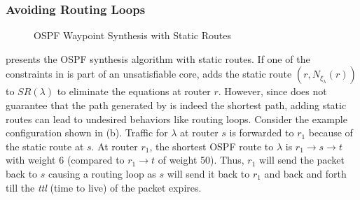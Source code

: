 

\subsubsection{Avoiding Routing Loops} \label{sec:loopavoidance}
\begin{wrapfigure}{r}{0.5\textwidth}
	\vspace{-7mm}
	\begin{minipage}{\linewidth}
		\begin{algorithm}[H]
			\begin{footnotesize} 
				\caption{OSPF Waypoint Synthesis with Static Routes}
				\label{alg:wayptunsat}
				\begin{algorithmic}[1]
					\EndWhile
					\EndProcedure
				\end{algorithmic}
			\end{footnotesize}
		\end{algorithm}
	\end{minipage}
\end{wrapfigure}
 presents the OSPF 
synthesis algorithm with static routes.  
If one of the constraints in  is part of an unsatisfiable  
core, \name adds the static route $(r, N_{\xi_\lambda}(r))$ to
$SR(\lambda)$ to eliminate the equations at router $r$. 
However, since  does not guarantee that the path generated
by \genesis is indeed the shortest path, adding
static routes can lead to undesired behaviors like routing loops.  
Consider the example configuration shown in (b). 
Traffic for $\lambda$ at router $s$ is forwarded to $r_1$ because of the
static route at $s$. At router $r_1$, the shortest OSPF route to
$\lambda$ is $r_1 \rightarrow s \rightarrow t$ with weight 6 (compared 
to $r_1 \rightarrow t$ of weight 50). Thus, $r_1$ will send the 
packet back to $s$  causing a routing loop as $s$ will send
it back to $r_1$ and back and forth till the \emph{ttl} (time to live) of the
packet expires. 



